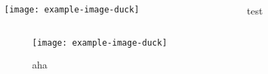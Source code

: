 \documentclass[final,t]{beamer}
\begin{document}
\begin{frame}
  \begin{columns}[T,onlytextwidth]
    \begin{column}{0.48\textwidth}
                    \centering
          \texttt{[image: example-image-duck]}
    \end{column}
  \begin{column}{0.48\textwidth}
  test
  \end{column}
\end{columns}
\end{frame}

\begin{frame}
  \begin{figure}
    \texttt{[image: example-image-duck]}
       \caption{aha}
    \end{figure}
  \end{frame}
\end{document}
